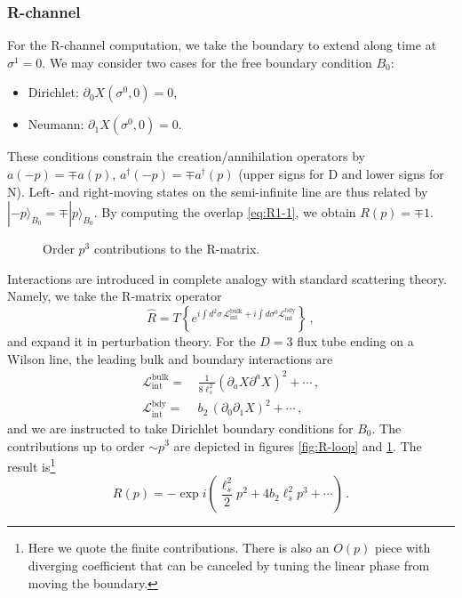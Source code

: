\documentclass[
 reprint,
 amsmath,
 pre,
 amssymb,
 nofootinbib,
 aps,
 longbibliography,
]{revtex4-1}
\newcommand{\<}{{\langle}}
\renewcommand{\>}{{\rangle}}
\begin{document}
\subsubsection{R-channel}
For the R-channel computation, we take the boundary to extend along time at $\sigma^1=0$. We may consider two cases for the free boundary condition $B_0$:
\begin{itemize}
    \item Dirichlet: $\partial_0 X(\sigma^0, 0)=0$,
    \item Neumann: $\partial_1 X(\sigma^0, 0)=0$.
\end{itemize}
These conditions constrain the creation/annihilation operators by $a(-p) = \mp a(p)$, $a^\dagger(-p) = \mp a^\dagger(p)$ (upper signs for D and lower signs for N). Left- and right-moving states on the semi-infinite line are thus related by $|-p\rangle_{B_0} = \mp |p\rangle_{B_0}$. By computing the overlap \eqref{eq:R1-1}, we obtain $R(p) = \mp 1$.


\begin{figure}[t]
\centering
{}
\caption{Order $p^3$ contributions to the R-matrix.}
\label{fig:R-tree}
\end{figure}

Interactions are introduced in complete analogy with standard scattering theory. Namely, we take the R-matrix operator
\begin{equation}
    \hat R = T\left\{e^{i\int d^2 \sigma\, \mathcal L_\text{int}^\text{bulk} + i \int d\sigma^0 \mathcal L_\text{int}^\text{bdy}}\right\}\,,
\end{equation}
and expand it in perturbation theory. For the $D=3$ flux tube ending on a Wilson line, the leading bulk and boundary interactions are
\begin{align}
    \mathcal L_\text{int}^\text{bulk} =&\, \frac{1}{8\ell_s^2} (\partial_a X \partial^a X)^2 + \cdots\,,\\
    \mathcal L_\text{int}^\text{bdy} =&\, b_2\, (\partial_0 \partial_1 X)^2 + \cdots\,,
\end{align}
and we are instructed to take Dirichlet boundary conditions for $B_0$. The contributions up to order $\sim p^3$ are depicted in figures \ref{fig:R-loop} and \ref{fig:R-tree}. The result is\footnote{Here we quote the finite contributions. There is also an $O(p)$ piece with diverging coefficient that can be canceled by tuning the linear phase from moving the boundary.}
\begin{equation}\label{eq:REST}
    R(p) = - \exp i\left(\frac{\ell_s^2}{2}p^2 + 4b_2 \ell_s^2 p^3 +\cdots  \right)\,.
\end{equation}
\end{document}
